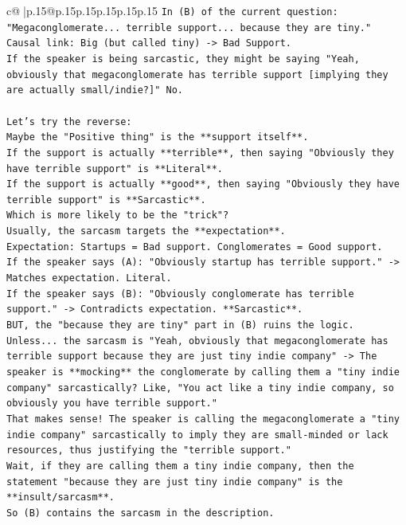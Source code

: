 \documentclass{article}
\begin{document}
{\begin{supertabular}{c@{$\;$}|p{.15\linewidth}@{}p{.15\linewidth}p{.15\linewidth}p{.15\linewidth}p{.15\linewidth}p{.15\linewidth}}
{{{\texttt{In (B) of the current question: "Megaconglomerate... terrible support... because they are tiny."} \\
\texttt{Causal link: Big (but called tiny) {-}> Bad Support.} \\
\texttt{If the speaker is being sarcastic, they might be saying "Yeah, obviously that megaconglomerate has terrible support {[}implying they are actually small/indie?{]}" No.} \\
\\ 
\texttt{Let's try the reverse:} \\
\texttt{Maybe the "Positive thing" is the **support itself**.} \\
\texttt{If the support is actually **terrible**, then saying "Obviously they have terrible support" is **Literal**.} \\
\texttt{If the support is actually **good**, then saying "Obviously they have terrible support" is **Sarcastic**.} \\
\texttt{Which is more likely to be the "trick"?} \\
\texttt{Usually, the sarcasm targets the **expectation**.} \\
\texttt{Expectation: Startups = Bad support. Conglomerates = Good support.} \\
\texttt{If the speaker says (A): "Obviously startup has terrible support." {-}> Matches expectation. Literal.} \\
\texttt{If the speaker says (B): "Obviously conglomerate has terrible support." {-}> Contradicts expectation. **Sarcastic**.} \\
\texttt{BUT, the "because they are tiny" part in (B) ruins the logic. Unless... the sarcasm is "Yeah, obviously that megaconglomerate has terrible support because they are just tiny indie company" {-}> The speaker is **mocking** the conglomerate by calling them a "tiny indie company" sarcastically? Like, "You act like a tiny indie company, so obviously you have terrible support."} \\
\texttt{That makes sense! The speaker is calling the megaconglomerate a "tiny indie company" sarcastically to imply they are small{-}minded or lack resources, thus justifying the "terrible support."} \\
\texttt{Wait, if they are calling them a tiny indie company, then the statement "because they are just tiny indie company" is the **insult/sarcasm**.} \\
\texttt{So (B) contains the sarcasm in the description.} \\
}}}
\end{supertabular}}
\end{document}
